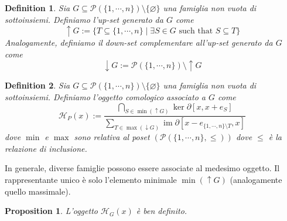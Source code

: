 \documentclass[a4paper]{article}
\DeclareMathOperator{\im}{im}
\newtheorem{proposition}[theorem]{Proposition}
\newtheorem{definition}{Definition}[section]
\begin{document}
\begin{definition}
    Sia \(G \subseteq \mathcal P(\{1, \cdots, n\}) \setminus \{\varnothing\}\) una famiglia non vuota
    di sottoinsiemi. Definiamo l'\emph{up-set generato da \(G\)} come \[
        \uparrow G := \{
            T \subseteq \{1, \cdots, n\} \mid \exists S \in G \text{ such that } S \subseteq T
        \}
    \]
    Analogamente, definiamo il \emph{down-set complementare all'up-set generato da \(G\)} come \[
        \downarrow G := \mathcal P(\{1, \cdots, n\}) \setminus \uparrow G
    \]
\end{definition}

\begin{definition}
    Sia \(G \subseteq \mathcal P(\{1, \cdots, n\}) \setminus \{\varnothing\}\) una famiglia non vuota
    di sottoinsiemi.
    Definiamo l'oggetto comologico associato a \(G\) come
    \[
        \mathcal H_P(x) := \frac{
            \displaystyle\bigcap_{S \in \min(\uparrow G)} \ker \partial\left[x, x+e_S\right]
        }{
            \displaystyle\sum_{T \in \max(\downarrow G)} \im \partial\left[x - e_{\{1, \cdots, n\} \setminus T}, x\right]
        }
    \]
    dove \(\min\) e \(\max\) sono relativa al poset \((\mathcal P(\{1, \cdots, n\}, \leq))\) dove
    \(\leq\) è la relazione di inclusione.
\end{definition}

In generale, diverse famiglie possono essere associate al medesimo oggetto.
Il rappresentante unico è solo l'elemento minimale \(\min(\uparrow G)\) (analogamente quello massimale).

\begin{proposition}
    L'oggetto \(\mathcal H_G(x)\) è ben definito.
\end{proposition}
\end{document}

